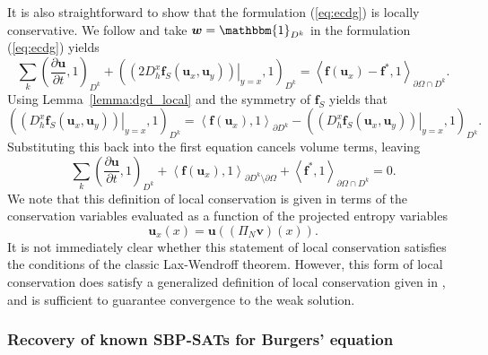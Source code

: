\documentclass[preprint,10pt]{article}
\theoremstyle{definition}
\theoremstyle{lemma}
\theoremstyle{theorem}
\theoremstyle{assumption}
\newcommand{\pd}[2]{\frac{\partial#1}{\partial#2}}
\newcommand{\LRp}[1]{\left( #1 \right)}
\newcommand{\LRa}[1]{\left\langle #1 \right\rangle}
\begin{document}
It is also straightforward to show that the formulation (\ref{eq:ecdg}) is locally conservative.  We follow \cite{chen2017entropy} and take $\bm{w} = \mathbbm{1}_{D^k}$ in the formulation (\ref{eq:ecdg}) yields
\[
\sum_{k}\LRp{\pd{\bm{u}}{t},1}_{D^k} + \LRp{\left.\LRp{2D^x_h\bm{f}_S(\bm{u}_x,\bm{u}_y)}\right|_{y=x},1}_{D^k} = \LRa{\bm{f}(\bm{u}_x)-\bm{f}^*,1}_{\partial \Omega \cap D^k}.  
\]
Using Lemma~\ref{lemma:dgd_local} and the symmetry of $\bm{f}_S$ yields that
\[
\LRp{\left.\LRp{D^x_h\bm{f}_S(\bm{u}_x,\bm{u}_y)}\right|_{y=x},1}_{D^k} = \LRa{\bm{f}(\bm{u}_x) ,1}_{\partial D^k} - \LRp{\left.\LRp{D^x_h\bm{f}_S(\bm{u}_x,\bm{u}_y)}\right|_{y=x},1}_{D^k}.
\]
Substituting this back into the first equation cancels volume terms, leaving
\[
\sum_{k}\LRp{\pd{\bm{u}}{t},1}_{D^k} + \LRa{\bm{f}(\bm{u}_x) ,1}_{\partial D^k \setminus \partial \Omega} + \LRa{\bm{f}^*,1}_{\partial \Omega \cap D^k} = 0.  
\]
We note that this definition of local conservation is given in terms of the conservation variables evaluated as a function of the projected entropy variables
\[
\bm{u}_x(x) = \bm{u}\LRp{\LRp{\Pi_N \bm{v}}(x)}.
\]
It is not immediately clear whether this statement of local conservation satisfies the conditions of the classic Lax-Wendroff theorem.  However, this form of local conservation does satisfy a generalized definition of local conservation given in \cite{shi2017local}, and is sufficient to guarantee convergence to the weak solution.  



\subsubsection{Recovery of known SBP-SATs for Burgers' equation}
\label{sec:recovery}
\end{document}

